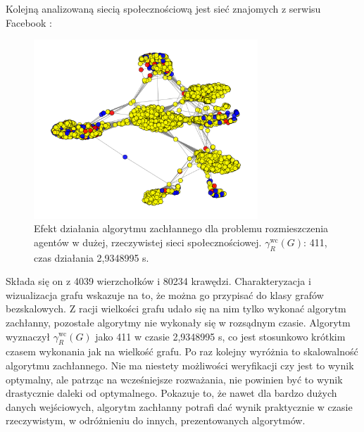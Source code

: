 Kolejną analizowaną siecią społecznościową jest sieć znajomych z serwisu Facebook \cite{FACEBOOK}:

\begin{figure}[H]
    \centering
    \includegraphics[width=0.75\textwidth]{assets/Facebook/facebookgreedy.png}
    \caption{Efekt działania algorytmu zachłannego dla problemu rozmieszczenia agentów w dużej, rzeczywistej sieci społecznościowej. $\gamma^{\text{wc}}_R(G)$: 411, czas działania 2,9348995 s.}
    \label{fig:fbgreedy}
\end{figure}

 Składa się on z 4039 wierzchołków i 80234 krawędzi. Charakteryzacja i wizualizacja grafu wskazuje na to, że można go przypisać do klasy grafów bezskalowych. Z racji wielkości grafu udało się na nim tylko wykonać algorytm zachłanny, pozostałe algorytmy nie wykonały się w rozsądnym czasie. Algorytm wyznaczył $\gamma^{\text{wc}}_R(G)$ jako 411 w czasie 2,9348995 s, co jest stosunkowo krótkim czasem wykonania jak na wielkość grafu. Po raz kolejny wyróżnia to skalowalność algorytmu zachłannego. Nie ma niestety możliwości weryfikacji czy jest to wynik optymalny, ale patrząc na wcześniejsze rozważania, nie powinien być to wynik drastycznie daleki od optymalnego. Pokazuje to, że nawet dla bardzo dużych danych wejściowych, algorytm zachłanny potrafi dać wynik praktycznie w czasie rzeczywistym, w odróżnieniu do innych, prezentowanych algorytmów.